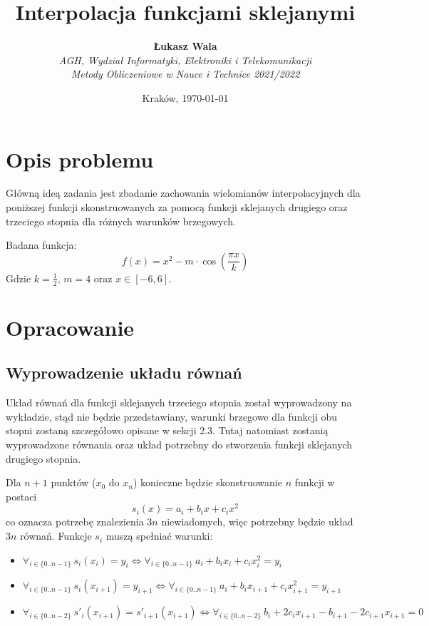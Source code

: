 \documentclass{article}
\title{Interpolacja funkcjami sklejanymi}
\author{\textbf{Łukasz Wala}\\
    \textit{AGH, Wydział Informatyki, Elektroniki i Telekomunikacji} \\
    \textit{Metody Obliczeniowe w Nauce i Technice 2021/2022}}
\date{Kraków, \today}
\begin{document}
\maketitle

\section{Opis problemu}
Główną ideą zadania jest zbadanie zachowania wielomianów interpolacyjnych
dla poniższej funkcji skonstruowanych za pomocą funkcji sklejanych drugiego oraz
trzeciego stopnia dla różnych warunków brzegowych.

Badana funkcja:
\[f(x)=x^2-m\cdot\cos\left(\frac{\pi x}{k}\right)\]
Gdzie $k=\frac{1}{2}$, $m=4$ oraz $x\in [-6,6]$.

\section{Opracowanie}
\subsection{Wyprowadzenie układu równań}
Układ równań dla funkcji sklejanych trzeciego stopnia został wyprowadzony na wykładzie, 
stąd nie będzie przedstawiany, warunki brzegowe dla funkcji obu stopni 
zostaną szczegółowo opisane w sekcji 2.3. Tutaj natomiast zostanią wyprowadzone równania
oraz układ potrzebny do stworzenia funkcji sklejanych drugiego stopnia.

Dla $n+1$ punktów ($x_0$ do $x_n$) konieczne będzie skonstruowanie $n$ funkcji w postaci
\[s_i(x)=a_i+b_ix+c_ix^2\]
co oznacza potrzebę znalezienia $3n$ niewiadomych, więc potrzebny będzie układ $3n$ równań.
Funkcje $s_i$ muszą spełniać warunki:
\begin{itemize}
    \item
    $\displaystyle\mathop \forall_{i\in\{0..n-1\}} \: s_i(x_i) = y_i \Leftrightarrow
    \displaystyle\mathop \forall_{i\in\{0..n-1\}} \: a_i+b_ix_i+c_ix_i^2 = y_i$
    \item
    $\displaystyle\mathop \forall_{i\in\{0..n-1\}} \: s_i(x_{i+1}) = y_{i+1} \Leftrightarrow
    \displaystyle\mathop \forall_{i\in\{0..n-1\}} \: a_i+b_ix_{i+1}+c_ix_{i+1}^2 = y_{i+1}$
    \item
    $\displaystyle\mathop \forall_{i\in\{0..n-2\}} \: s'_i(x_{i+1}) = s'_{i+1}(x_{i+1}) \Leftrightarrow
    \displaystyle\mathop \forall_{i\in\{0..n-2\}} \: b_i+2c_ix_{i+1}-b_{i+1}-2c_{i+1}x_{i+1} = 0$
\end{itemize}
\end{document}
